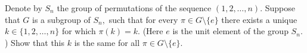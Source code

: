Denote by \(S_n\) the group of permutations of the sequence \((1,2,\dots,n).\) Suppose that \(G\) is a subgroup of \(S_n,\) such that for every \(\pi\in G\setminus\{e\}\) there exists a unique \(k\in \{1,2,\dots,n\}\) for which \(\pi(k)=k.\) (Here \(e\) is the unit element of the group \(S_n.\)) Show that this \(k\) is the same for all \(\pi \in G\setminus \{e\}.\)